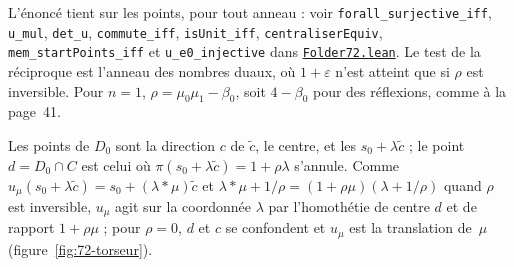 \noindent L'énoncé tient sur les points, pour tout anneau : voir \texttt{forall\_surjective\_iff}, \texttt{u\_mul}, \texttt{det\_u}, \texttt{commute\_iff}, \texttt{isUnit\_iff}, \texttt{centraliserEquiv}, \texttt{mem\_startPoints\_iff} et \texttt{u\_e0\_injective} dans \href{\leanblob/Geometry/Folder72.lean}{\texttt{Folder72.\allowbreak{}lean}}. Le test de la réciproque est l'anneau des nombres duaux, où $1 + \varepsilon$ n'est atteint que si $\rho$ est inversible. Pour $n = 1$, $\rho = \mu_0\mu_1 - \beta_0$, soit $4 - \beta_0$ pour des réflexions, comme à la page~41.

Les points de $D_0$ sont la direction $c$ de $\tilde c$, le centre, et les $s_0 + \lambda\tilde c$ ; le point $d = D_0 \cap C$ est celui où $\pi(s_0 + \lambda\tilde c) = 1 + \rho\lambda$ s'annule. Comme $u_\mu(s_0 + \lambda\tilde c) = s_0 + (\lambda * \mu)\tilde c$ et $\lambda * \mu + 1/\rho = (1 + \rho\mu)(\lambda + 1/\rho)$ quand $\rho$ est inversible, $u_\mu$ agit sur la coordonnée $\lambda$ par l'homothétie de centre $d$ et de rapport $1 + \rho\mu$ ; pour $\rho = 0$, $d$ et $c$ se confondent et $u_\mu$ est la translation de~$\mu$ (figure~\ref{fig:72-torseur}).

